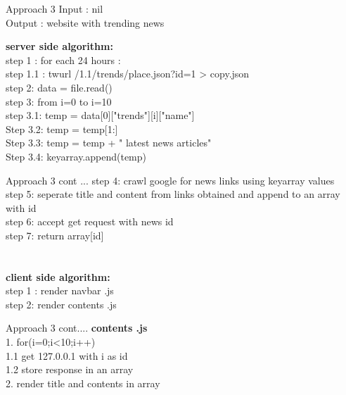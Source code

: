 \documentclass{beamer}
\begin{document}
\begin{frame}{Approach 3}
		\footnotesize
	\Large{Input : nil \\
	Output :  website with trending news}
	
	\footnotesize
	\textbf{\Large{server side algorithm: }}\\
\Large{	step 1 :  for each 24 hours : \\
	\hspace{.2cm} step 1.1 : twurl /1.1/trends/place.json?id=1 > copy.json\\
	step 2:  data = file.read() \\
	step 3:  from i=0 to i=10 \\
	\hspace{.2cm}step 3.1: temp = data[0]["trends"][i]["name"]\\   
	\hspace{.2cm}Step 3.2:  temp = temp[1:]  \\
\hspace{.2cm}Step 3.3:  temp = temp + " latest news articles"\\
\hspace{.2cm}Step 3.4:  keyarray.append(temp)  \\
 }
		
	\end{frame}
	\begin{frame}{Approach 3 cont ...}
    \Large{	
    step 4: crawl google for news links using keyarray values\\
    step 5: seperate title and content from links obtained  and append to an array with id \\
    step 6: accept get request with news id\\
    step 7: return array[id]\\   }
    \\
    \\
	\footnotesize
	\textbf{\Large{client side algorithm: }}\\
	\Large{step 1 : render  navbar .js  \\	
	step 2:  render  contents .js \\}
\end{frame}
\begin{frame}{Approach 3 cont....}
    \Large{\vspace{5mm}
	\textbf{contents .js}\\
	\vspace{5mm}
	1. for(i=0;i<10;i++)\\
	\hspace{.2cm}1.1 get 127.0.0.1 with i as id\\
	\hspace{.2cm}1.2 store response in an array\\
	2. render title and contents in array}
    
\end{frame}
\end{document}
